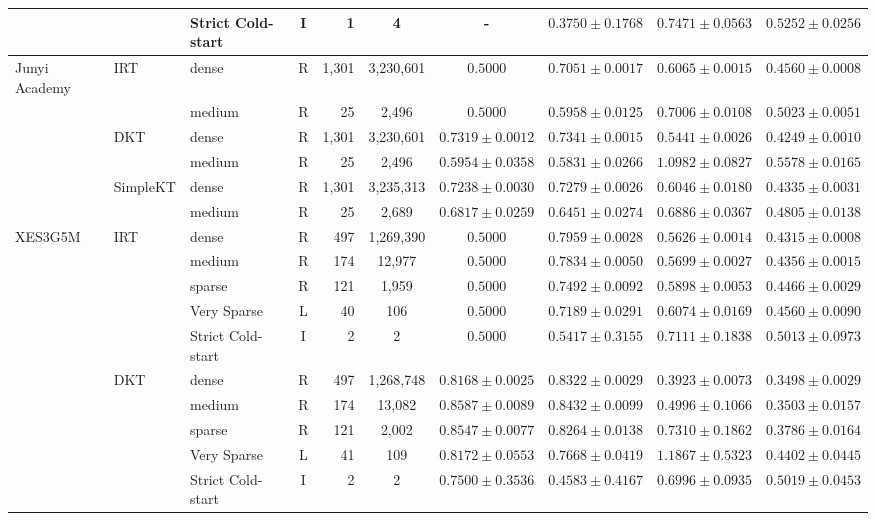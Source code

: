 \begin{table}[tbp]
{\begin{tabular}{lllcrccccc}
 &  & Strict Cold-start & I & 1 & 4 & - & $0.3750 \pm 0.1768$ & $0.7471 \pm 0.0563$ & $0.5252 \pm 0.0256$ \\
\midrule
Junyi Academy & IRT & dense & R & 1,301 & 3,230,601 & $0.5000$ & $0.7051 \pm 0.0017$ & $0.6065 \pm 0.0015$ & $0.4560 \pm 0.0008$ \\
 &  & medium & R & 25 & 2,496 & $0.5000$ & $0.5958 \pm 0.0125$ & $0.7006 \pm 0.0108$ & $0.5023 \pm 0.0051$ \\
 & DKT & dense & R & 1,301 & 3,230,601 & $0.7319 \pm 0.0012$ & $0.7341 \pm 0.0015$ & $0.5441 \pm 0.0026$ & $0.4249 \pm 0.0010$ \\
 &  & medium & R & 25 & 2,496 & $0.5954 \pm 0.0358$ & $0.5831 \pm 0.0266$ & $1.0982 \pm 0.0827$ & $0.5578 \pm 0.0165$ \\
 & SimpleKT & dense & R & 1,301 & 3,235,313 & $0.7238 \pm 0.0030$ & $0.7279 \pm 0.0026$ & $0.6046 \pm 0.0180$ & $0.4335 \pm 0.0031$ \\
 &  & medium & R & 25 & 2,689 & $0.6817 \pm 0.0259$ & $0.6451 \pm 0.0274$ & $0.6886 \pm 0.0367$ & $0.4805 \pm 0.0138$ \\
\midrule
XES3G5M & IRT & dense & R & 497 & 1,269,390 & $0.5000$ & $0.7959 \pm 0.0028$ & $0.5626 \pm 0.0014$ & $0.4315 \pm 0.0008$ \\
 &  & medium & R & 174 & 12,977 & $0.5000$ & $0.7834 \pm 0.0050$ & $0.5699 \pm 0.0027$ & $0.4356 \pm 0.0015$ \\
 &  & sparse & R & 121 & 1,959 & $0.5000$ & $0.7492 \pm 0.0092$ & $0.5898 \pm 0.0053$ & $0.4466 \pm 0.0029$ \\
 &  & Very Sparse & L & 40 & 106 & $0.5000$ & $0.7189 \pm 0.0291$ & $0.6074 \pm 0.0169$ & $0.4560 \pm 0.0090$ \\
 &  & Strict Cold-start & I & 2 & 2 & $0.5000$ & $0.5417 \pm 0.3155$ & $0.7111 \pm 0.1838$ & $0.5013 \pm 0.0973$ \\
 & DKT & dense & R & 497 & 1,268,748 & $0.8168 \pm 0.0025$ & $0.8322 \pm 0.0029$ & $0.3923 \pm 0.0073$ & $0.3498 \pm 0.0029$ \\
 &  & medium & R & 174 & 13,082 & $0.8587 \pm 0.0089$ & $0.8432 \pm 0.0099$ & $0.4996 \pm 0.1066$ & $0.3503 \pm 0.0157$ \\
 &  & sparse & R & 121 & 2,002 & $0.8547 \pm 0.0077$ & $0.8264 \pm 0.0138$ & $0.7310 \pm 0.1862$ & $0.3786 \pm 0.0164$ \\
 &  & Very Sparse & L & 41 & 109 & $0.8172 \pm 0.0553$ & $0.7668 \pm 0.0419$ & $1.1867 \pm 0.5323$ & $0.4402 \pm 0.0445$ \\
 &  & Strict Cold-start & I & 2 & 2 & $0.7500 \pm 0.3536$ & $0.4583 \pm 0.4167$ & $0.6996 \pm 0.0935$ & $0.5019 \pm 0.0453$ \\

\end{tabular}}
\end{table}
